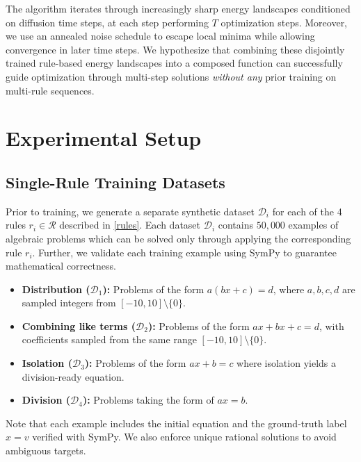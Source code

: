 \documentclass{article}
\begin{document}
The algorithm iterates through increasingly sharp energy landscapes conditioned on diffusion time steps, at each step performing $T$ optimization steps. Moreover, we use an annealed noise schedule to escape local minima while allowing convergence in later time steps. We hypothesize that combining these disjointly trained rule-based energy landscapes into a composed function can successfully guide optimization through multi-step solutions \emph{without any} prior training on multi-rule sequences.

\section{Experimental Setup}

\subsection{Single-Rule Training Datasets}

Prior to training, we generate a separate synthetic dataset $\mathcal{D}_i$ for each of the 4 rules $r_i \in \mathcal{R}$ described in \ref{rules}. Each dataset $\mathcal{D}_i$ contains $50,000$ examples of algebraic problems which can be solved only through applying the corresponding rule $r_i$. Further, we validate each training example using SymPy to guarantee mathematical correctness. 
\begin{itemize}
    \item \textbf{Distribution ($\mathcal{D}_1$):} Problems of the form $a(bx + c) = d$, where $a, b, c, d$ are sampled integers from $[-10, 10] \setminus \{0\}$. 
    
    \item \textbf{Combining like terms ($\mathcal{D}_2$):} Problems of the form $ax + bx + c = d$, with coefficients sampled from the same range $[-10, 10] \setminus \{0\}$.
    
    \item \textbf{Isolation ($\mathcal{D}_3$):} Problems of the form $ax + b = c$ where isolation yields a division-ready equation.
    
    \item \textbf{Division ($\mathcal{D}_4$):} Problems taking the form of $ax = b$. 
\end{itemize}

Note that each example includes the initial equation and the ground-truth label $x = v$ verified with SymPy. We also enforce unique rational solutions to avoid ambiguous targets.
\end{document}
